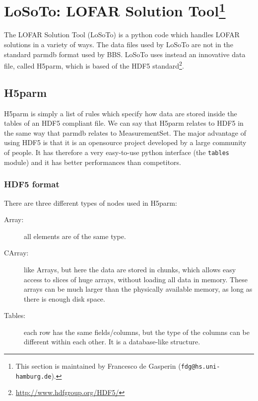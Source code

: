 \documentclass[structabstract]{article}
\begin{document}

\def \losoto {LoSoTo}

\section[LoSoTo: LOFAR Solution Tool]{\losoto: LOFAR Solution Tool\footnote{This section is maintained by Francesco de Gasperin ({\tt fdg@hs.uni-hamburg.de}).}}
\label{BBS}

The LOFAR Solution Tool (\losoto{}) is a python code which handles LOFAR solutions in a variety of ways. The data files used by \losoto{} are not in the standard parmdb format used by BBS. \losoto{} uses instead an innovative data file, called H5parm, which is based of the HDF5 standard\footnote{\url{http://www.hdfgroup.org/HDF5/}}.

\subsection{H5parm}
\label{losoto:h5parm}

H5parm is simply a list of rules which specify how data are stored inside the tables of an HDF5 compliant file. We can say that H5parm relates to HDF5 in the same way that parmdb relates to MeasurementSet. The major advantage of using HDF5 is that it is an opensource project developed by a large community of people. It has therefore a very easy-to-use python interface (the \texttt{tables} module) and it has better performances than competitors.

\subsubsection{HDF5 format}
\label{losoto:HDF5}

There are three different types of nodes used in H5parm:
\begin{description}
 \item[Array:] all elements are of the same type.
 \item[CArray:] like Arrays, but here the data are stored in chunks, which allows easy access to
slices of huge arrays, without loading all data in memory. These arrays can be much
larger than the physically available memory, as long as there is enough disk space.
 \item[Tables:] each row has the same fields/columns, but the type of the columns can be different within each other. It is a database-like structure.
\end{description}
 
\end{document}

